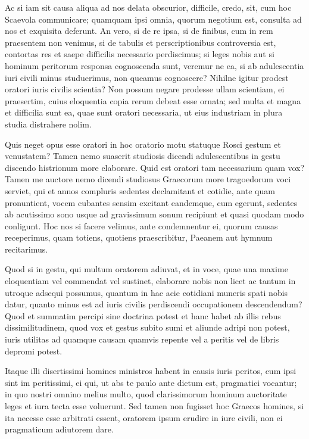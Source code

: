  Ac si iam sit causa aliqua ad nos delata obscurior, difficile, credo, sit, cum hoc Scaevola communicare; quamquam ipsi omnia, quorum negotium est, consulta ad nos et exquisita deferunt. An vero, si de re ipsa, si de finibus, cum in rem praesentem non venimus, si de tabulis et perscriptionibus controversia est, contortas res et saepe difficilis necessario perdiscimus; si leges nobis aut si hominum peritorum responsa cognoscenda sunt, veremur ne ea, si ab adulescentia iuri civili minus studuerimus, non queamus cognoscere? Nihilne igitur prodest oratori iuris civilis scientia? Non possum negare prodesse ullam scientiam, ei praesertim, cuius eloquentia copia rerum debeat esse ornata; sed multa et magna et difficilia sunt ea, quae sunt oratori necessaria, ut eius industriam in plura studia distrahere nolim.

 Quis neget opus esse oratori in hoc oratorio motu statuque Rosci gestum et venustatem? Tamen nemo suaserit studiosis dicendi adulescentibus in gestu discendo histrionum more elaborare. Quid est oratori tam necessarium quam vox? Tamen me auctore nemo dicendi studiosus Graecorum more tragoedorum voci serviet, qui et annos compluris sedentes declamitant et cotidie, ante quam pronuntient, vocem cubantes sensim excitant eandemque, cum egerunt, sedentes ab acutissimo sono usque ad gravissimum sonum recipiunt et quasi quodam modo conligunt. Hoc nos si facere velimus, ante condemnentur ei, quorum causas receperimus, quam totiens, quotiens praescribitur, Paeanem aut hymnum recitarimus.

 Quod si in gestu, qui multum oratorem adiuvat, et in voce, quae una maxime eloquentiam vel commendat vel sustinet, elaborare nobis non licet ac tantum in utroque adsequi possumus, quantum in hac acie cotidiani muneris spati nobis datur, quanto minus est ad iuris civilis perdiscendi occupationem descendendum? Quod et summatim percipi sine doctrina potest et hanc habet ab illis rebus dissimilitudinem, quod vox et gestus subito sumi et aliunde adripi non potest, iuris utilitas ad quamque causam quamvis repente vel a peritis vel de libris depromi potest.

 Itaque illi disertissimi homines ministros habent in causis iuris peritos, cum ipsi sint im peritissimi, ei qui, ut abs te paulo ante dictum est, pragmatici vocantur; in quo nostri omnino melius multo, quod clarissimorum hominum auctoritate leges et iura tecta esse voluerunt. Sed tamen non fugisset hoc Graecos homines, si ita necesse esse arbitrati essent, oratorem ipsum erudire in iure civili, non ei pragmaticum adiutorem dare.

